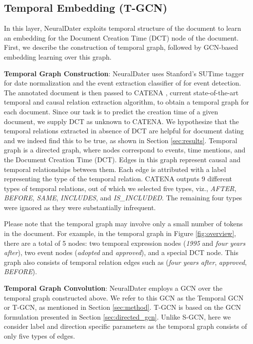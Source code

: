 \documentclass[11pt,a4paper]{article}
\newcommand{\reffig}[1]{Figure \ref{#1}}
\newcommand{\refsec}[1]{Section \ref{#1}}
\newcommand{\method}{NeuralDater}
\begin{document}
\subsection{Temporal Embedding (T-GCN)}
\label{sec:t-gcn}

In this layer, \method{} exploits temporal structure of the document to learn an embedding for the Document Creation Time (DCT) node of the document. First, we describe the construction of temporal graph, followed by GCN-based embedding learning over this graph.

\textbf{Temporal Graph Construction}: \method{} uses Stanford's SUTime tagger \cite{sutime_paper} for date normalization and the event extraction classifier of \cite{Chambers14} for event detection. The annotated document is then passed to CATENA \cite{catena_paper}, current state-of-the-art temporal and causal relation extraction algorithm, to obtain a temporal graph for each document. Since our task is to predict the creation time of a given document, we supply DCT as unknown to CATENA. We hypothesize that the temporal relations extracted in absence of DCT are helpful for document dating and we indeed find this to be true, as shown in Section \ref{sec:results}. Temporal graph is a directed graph, where nodes correspond to events, time mentions, and the Document Creation Time (DCT). Edges in this graph represent causal and temporal relationships between them. Each edge is attributed with a label representing the type of the temporal relation. CATENA outputs 9 different types of temporal relations, out of which we selected five types, viz.,  \textit{AFTER}, \textit{BEFORE}, \textit{SAME}, \textit{INCLUDES}, and  \textit{IS\_INCLUDED}. The remaining four types were ignored as they were substantially infrequent. 

Please note that the temporal graph may involve only a small number of tokens in the document. For example, in the temporal graph in \reffig{fig:overview}, there are a total of 5 nodes: two temporal expression nodes (\textit{1995} and \textit{four years after}), two event nodes (\textit{adopted} and \textit{approved}), and a special DCT node. This graph also consists of temporal relation edges such as (\textit{four years after}, \textit{approved}, \textit{BEFORE}). 



\textbf{Temporal Graph Convolution}: \method{} employs a GCN over the temporal graph constructed above. We refer to this GCN as the Temporal GCN or T-GCN, as mentioned in \refsec{sec:method}. T-GCN is based on the GCN formulation presented in \refsec{sec:directed_gcn}. Unlike S-GCN, here we consider label and direction specific parameters as the temporal graph consists of only five types of edges.
\end{document}
